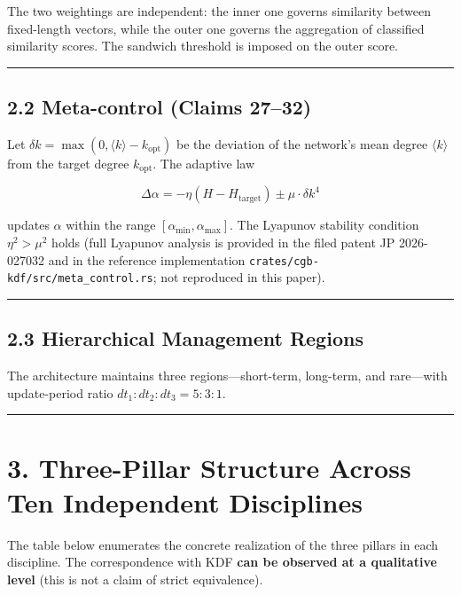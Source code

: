 The two weightings are independent: the inner one governs similarity between fixed-length vectors, while the outer one governs the aggregation of classified similarity scores. The sandwich threshold is imposed on the outer score.

\begin{center}\rule{0.5\linewidth}{0.5pt}\end{center}

\subsection{2.2 Meta-control (Claims 27--32)}\label{meta-control-claims-2732}

Let \(\delta k = \max(0, \langle k \rangle - k_{\text{opt}})\) be the deviation of the network's mean degree \(\langle k \rangle\) from the target degree \(k_{\text{opt}}\). The adaptive law

\[
\Delta \alpha = -\eta (H - H_{\text{target}}) \pm \mu \cdot \delta k^{4}
\]

updates \(\alpha\) within the range \([\alpha_{\min}, \alpha_{\max}]\). The Lyapunov stability condition \(\eta^2 > \mu^2\) holds (full Lyapunov analysis is provided in the filed patent JP 2026-027032 and in the reference implementation \texttt{crates/cgb-kdf/src/meta\_control.rs}; not reproduced in this paper).

\begin{center}\rule{0.5\linewidth}{0.5pt}\end{center}

\subsection{2.3 Hierarchical Management Regions}\label{hierarchical-management-regions}

The architecture maintains three regions---short-term, long-term, and rare---with update-period ratio \(dt_1 : dt_2 : dt_3 = 5 : 3 : 1\).

\begin{center}\rule{0.5\linewidth}{0.5pt}\end{center}

\section{3. Three-Pillar Structure Across Ten Independent Disciplines}\label{three-pillar-structure-across-ten-independent-disciplines}

The table below enumerates the concrete realization of the three pillars in each discipline. The correspondence with KDF \textbf{can be observed at a qualitative level} (this is not a claim of strict equivalence).

